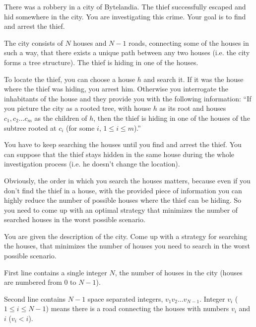 

There was a robbery in a city of Bytelandia.
The thief successfully escaped and hid somewhere in the city.
You are investigating this crime. Your goal is to find and arrest the thief.

The city consists of $N$ houses and $N-1$ roads, connecting some of the houses in
such a way, that there exists a unique path between any two houses (i.e. the city forms a tree structure).
The thief is hiding in one of the houses.

To locate the thief, you can choose a house $h$ and search it.
If it was the house where the thief was hiding, you arrest him.
Otherwise you interrogate the inhabitants of the house and they provide you with the following information:
``If you picture the city as a rooted tree, with house $h$ as its root and houses $c_1, c_2 \ldots c_m$ as the children of $h$,
then the thief is hiding in one of the houses of the subtree rooted at $c_i$ (for some $i$, $1 \leq i \leq m$).''

You have to keep searching the houses until you find and arrest the thief.
You can suppose that the thief stays hidden in the same house during the whole investigation process (i.e. he doesn't change the location).

Obviously, the order in which you search the houses matters, because even if you don't
find the thief in a house, with the provided piece of information you can highly reduce
the number of possible houses where the thief can be hiding.
So you need to come up with an optimal strategy that
minimizes the number of searched houses in the worst possible scenario.


You are given the description of the city.
Come up with a strategy for searching the houses, that minimizes the number
of houses you need to search in the worst possible scenario.


First line contains a single integer $N$, the number of houses in the city (houses are numbered from $0$ to $N-1$).

Second line contains $N-1$ space separated integers, $v_1 v_2 \ldots v_{N-1}$.
Integer $v_i$ ($1 \leq i \leq N-1$) means there is a road connecting the houses with numbers $v_i$ and $i$ ($v_i < i$).

